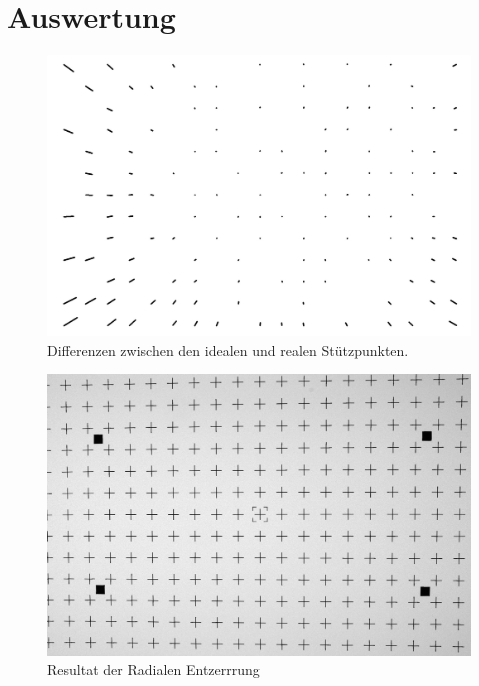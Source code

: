 \section{Auswertung}
\begin{figure}[H]
	\includegraphics[width=\textwidth]{Images/Auswertung/Testbild1/SourceImage with PointPairs_onlydiffs.jpg}
	\caption{Differenzen zwischen den idealen und realen Stützpunkten.}
	\label{fig:diffsResult}
\end{figure}

\begin{figure}[H]
	\includegraphics[width=\textwidth]{Images/Auswertung/Testbild1/Radial.jpg}
	\caption{Resultat der Radialen Entzerrrung}
	\label{fig:Ergebnis}
\end{figure}

